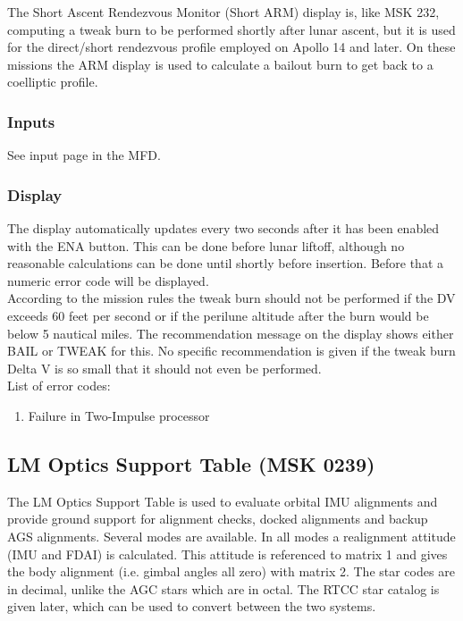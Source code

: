 \documentclass[11pt]{article} %
\begin{document}
The Short Ascent Rendezvous Monitor (Short ARM) display is, like MSK 232, computing a tweak burn to be performed shortly after lunar ascent, but it is used for the direct/short rendezvous profile employed on Apollo 14 and later. On these missions the ARM display is used to calculate a bailout burn to get back to a coelliptic profile.
\subsubsection{Inputs}
See input page in the MFD.
\subsubsection{Display}
The display automatically updates every two seconds after it has been enabled with the ENA button. This can be done before lunar liftoff, although no reasonable calculations can be done until shortly before insertion. Before that a numeric error code will be displayed.\\

According to the mission rules the tweak burn should not be performed if the DV exceeds 60 feet per second or if the perilune altitude after the burn would be below 5 nautical miles. The recommendation message on the display shows either BAIL or TWEAK for this. No specific recommendation is given if the tweak burn Delta V is so small that it should not even be performed.\\

List of error codes:
\begin{enumerate}
	\item Failure in Two-Impulse processor
\end{enumerate}
\newpage
\subsection{LM Optics Support Table (MSK 0239)}

The LM Optics Support Table is used to evaluate orbital IMU alignments and provide ground support for alignment checks, docked alignments and backup AGS alignments. Several modes are available. In all modes a realignment attitude (IMU and FDAI) is calculated. This attitude is referenced to matrix 1 and gives the body alignment (i.e. gimbal angles all zero) with matrix 2. The star codes are in decimal, unlike the AGC stars which are in octal. The RTCC star catalog is given later, which can be used to convert between the two systems.\\
\end{document}
